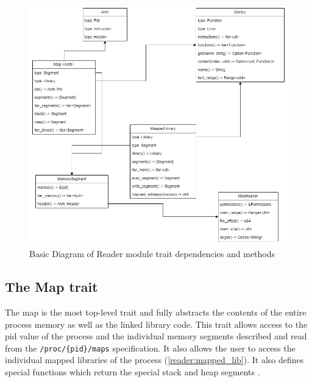 \begin{figure}[h]
    \centering
    \includegraphics[width=1\linewidth]{reader_traits.drawio.png}
    \caption{Basic Diagram of Reader module trait dependencies and methods}
    \label{fig:reader-traits}
\end{figure}

    \subsection{The Map trait}
    \label{reader:map}

The map is the most top-level trait and fully abstracts the contents of the entire process memory as well as the linked library code.
This trait allows access to the pid value of the process and the individual memory segments described and read from the \verb|/proc/{pid}/maps| \cite{kerrisk_proc_pid_maps5_2024} specification.
It also allows the user to access the individual mapped libraries of the process (\autoref{reader:mapped_lib}).
It also defines special functions which return the special stack and heap segments \cite{kerrisk_memory_2010}.

